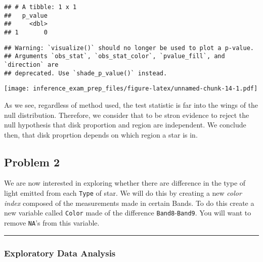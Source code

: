 \documentclass[]{article}
\newenvironment{Shaded}{\begin{snugshade}}{\end{snugshade}}
\newcommand{\DataTypeTok}[1]{\textcolor[rgb]{0.13,0.29,0.53}{#1}}
\newcommand{\KeywordTok}[1]{\textcolor[rgb]{0.13,0.29,0.53}{\textbf{#1}}}
\newcommand{\NormalTok}[1]{#1}
\newcommand{\OperatorTok}[1]{\textcolor[rgb]{0.81,0.36,0.00}{\textbf{#1}}}
\newcommand{\StringTok}[1]{\textcolor[rgb]{0.31,0.60,0.02}{#1}}
\begin{document}
\begin{verbatim}
## # A tibble: 1 x 1
##   p_value
##     <dbl>
## 1       0
\end{verbatim}

\begin{Shaded}
\end{Shaded}

\begin{verbatim}
## Warning: `visualize()` should no longer be used to plot a p-value.
## Arguments `obs_stat`, `obs_stat_color`, `pvalue_fill`, and `direction` are
## deprecated. Use `shade_p_value()` instead.
\end{verbatim}

\texttt{[image: inference\_exam\_prep\_files/figure-latex/unnamed-chunk-14-1.pdf]}

As we see, regardless of method used, the test statistic is far into the
wings of the null distribution. Therefore, we consider that to be stron
evidence to reject the null hypothesis that disk proportion and region
are independent. We conclude then, that disk proprtion depends on which
region a star is in.

\hypertarget{problem-2}{%
\subsection{Problem 2}\label{problem-2}}

We are now interested in exploring whether there are difference in the
type of light emitted from each \texttt{Type} of star. We will do this
by creating a new \emph{color index} composed of the measurements made
in certain Bands. To do this create a new variable called \texttt{Color}
made of the difference \texttt{Band8}-\texttt{Band9}. You will want to
remove \texttt{NA}'s from this variable.

\begin{center}\rule{0.5\linewidth}{\linethickness}\end{center}

\hypertarget{exploratory-data-analysis-1}{%
\subsubsection{Exploratory Data
Analysis}\label{exploratory-data-analysis-1}}
\end{document}
